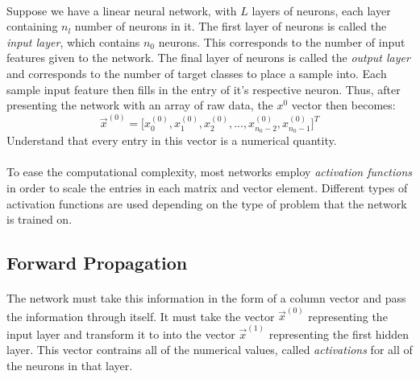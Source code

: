 \documentclass[12pt,letterpaper]{article}
\begin{document}
\paragraph*{}Suppose we have a linear neural network, with $L$ layers of neurons, each layer containing $n_l$ number of neurons in it. The first layer of neurons is called the \textit{input layer}, which contains $n_0$ neurons. This corresponds to the number of input features given to the network. The final layer of neurons is called the \textit{output layer} and corresponds to the number of target classes to place a sample into. Each sample input feature then fills in the entry of it's respective neuron. Thus, after presenting the network with an array of raw data, the $x^0$ vector then becomes:
\begin{equation}
\label{layer0}
\vec{x}^(0) = \big[ x^{(0)}_0 , x^{(0)}_1 , x^{(0)}_2 , ... , 
x^{(0)}_{n_0-2} , x^{(0)}_{n_0-1} \big]^T  
\end{equation} 
Understand that every entry in this vector is a numerical quantity.
\paragraph*{}To ease the computational complexity, most networks employ \textit{activation functions} \cite{Goodfellow} in order to scale the entries in each matrix and vector element. Different types of activation functions are used depending on the type of problem that the network is trained on. 


\subsection{Forward Propagation}
\paragraph*{}The network must take this information in the form of a column vector and pass the information through itself. It must take the vector $\vec{x}^{(0)}$ representing the input layer and transform it to into the vector $\vec{x}^{(1)}$ representing the first hidden layer. This vector contrains all of the numerical values, called \textit{activations} \cite{Geron} for all of the neurons in that layer. 
\end{document}
